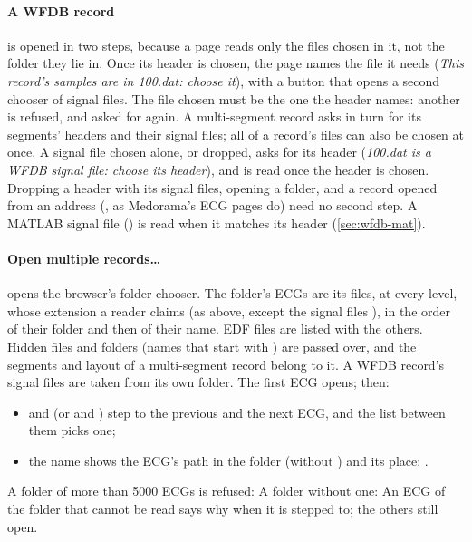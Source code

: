 \paragraph{A WFDB record}\label{sec:ecg-viewer-open-wfdb} is opened in two steps, because a page reads
only the files chosen in it, not the folder they lie in. Once its header is chosen, the page
names the file it needs (\emph{This record's samples are in 100.dat: choose it}), with a button
that opens a second chooser of signal files. The file chosen must be the one the header names:
another is refused, and asked for again. A multi-segment record asks in turn for its segments'
headers and their signal files; all of a record's files can also be chosen at once. A signal file
chosen alone, or dropped, asks for its header (\emph{100.dat is a WFDB signal file: choose its
header}), and is read once the header is chosen. Dropping a header with its signal files, opening
a folder, and a record opened from an address (, as Medorama's ECG pages do) need no
second step. A MATLAB signal file () is read when it matches its header
(\cref{sec:wfdb-mat}).

\paragraph{Open multiple records\dots} opens the browser's folder chooser. The folder's ECGs are
its files, at every level, whose extension a reader claims (as above, except the signal files
), in the order of their folder and then of their name. EDF files are listed with the
others. Hidden files and folders (names that start with ) are passed over, and the
segments and layout of a multi-segment record belong to it. A WFDB record's signal files are taken
from its own folder. The first ECG opens; then:
\begin{itemize}
\item \ui{\textless} and \ui{\textgreater} (or \key{$\leftarrow$} and \key{$\rightarrow$}) step to the
  previous and the next ECG, and the list between them picks one;
\item the name shows the ECG's path in the folder (without ) and its place:
  .
\end{itemize}
A folder of more than 5000 ECGs is refused:  A folder without one:  An ECG of the
folder that cannot be read says why when it is stepped to; the others still open.

